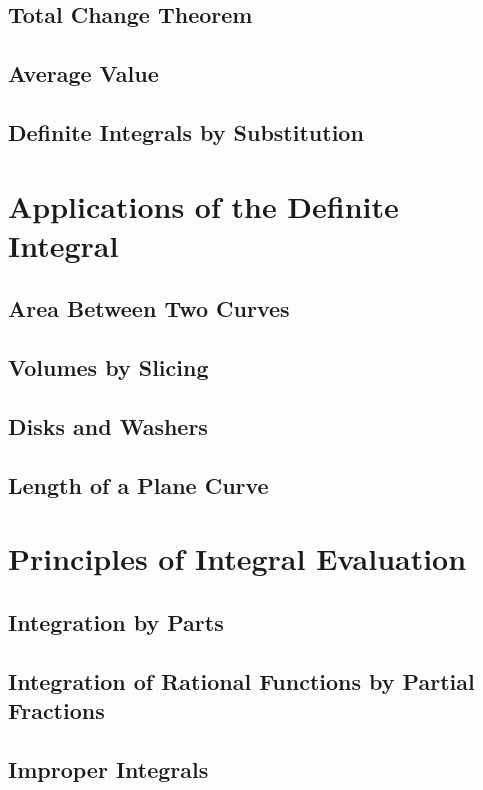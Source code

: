 \documentclass[letterpaper]{report}
\begin{document}
\section{Total Change Theorem}
\section{Average Value}
\section{Definite Integrals by Substitution}

\chapter{Applications of the Definite Integral}
\section{Area Between Two Curves}
\section{Volumes by Slicing}
\section{Disks and Washers}
\section{Length of a Plane Curve}

\chapter{Principles of Integral Evaluation}
\section{Integration by Parts}
\section{Integration of Rational Functions by Partial Fractions}
\section{Improper Integrals}

\end{document}
